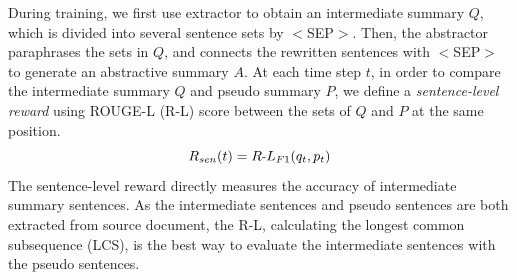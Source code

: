During training, we first use extractor to obtain an 
intermediate summary $Q$, which is divided into several sentence sets by $<$SEP$>$.
Then, the abstractor paraphrases the sets in $Q$, 
and connects the rewritten sentences with $<$SEP$>$ to generate an abstractive summary $A$.
At each time step $t$,
in order to compare the intermediate summary $Q$ and pseudo summary $P$,
we define a {\em sentence-level reward} using
ROUGE-L (R-L) score between the sets of $Q$ and $P$ at the same position.
\begin{equation}
\small
R_{sen}(t) = R\textup{-}L_{F1}(q_t,p_t)
\end{equation}
The sentence-level reward directly measures the accuracy of intermediate
summary sentences.
As the intermediate sentences and pseudo sentences are 
both extracted from source document,
the R-L, calculating the longest common subsequence (LCS), is the best way to 
evaluate the intermediate sentences with the 
pseudo sentences.

